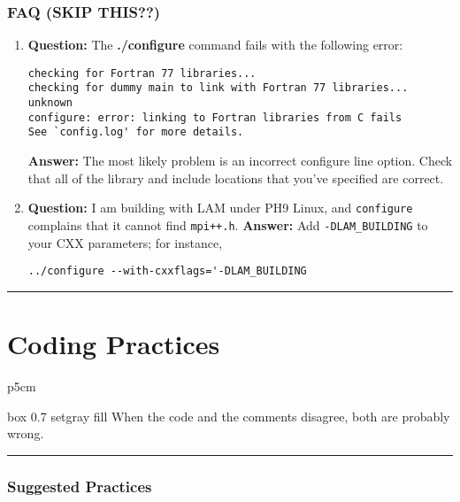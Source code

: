 \documentclass[10pt,letter,relax]{SANDreport}
\newcommand{\HRule}{\noindent\rule{\linewidth}{1mm}}
\begin{document}

\section{FAQ (SKIP THIS??)}
\label{sec:faq}

\begin{enumerate}
\item {\bf Question:} The {\bf ./configure} command
fails with the following error:
\begin{verbatim}
checking for Fortran 77 libraries...
checking for dummy main to link with Fortran 77 libraries... unknown
configure: error: linking to Fortran libraries from C fails
See `config.log' for more details.
\end{verbatim}
{\bf Answer:} The most likely problem is an incorrect configure line option.   Check
that all of the library and include locations that you've specified are
correct.
%
\item {\bf Question:} I am building with LAM under PH9 Linux, and
  {\tt configure} complains that it cannot find {\tt mpi++.h}.
{\bf Answer:} Add \verb!-DLAM_BUILDING! to your CXX parameters; for
instance,
\begin{verbatim}
../configure --with-cxxflags='-DLAM_BUILDING
\end{verbatim}
\end{enumerate}


\clearpage
\newpage

\vspace*{3cm}
\HRule
\part{Coding Practices}

\medskip

\hfill
\begin{tabular}{p{5cm}}
\begin{boxitpara}{box 0.7 setgray fill}
When the code and the comments disagree, both are probably wrong.
\end{boxitpara}
\end{tabular}

\HRule
\clearpage
\newpage


\section{Suggested Practices}
\label{sec:code}
\end{document}
